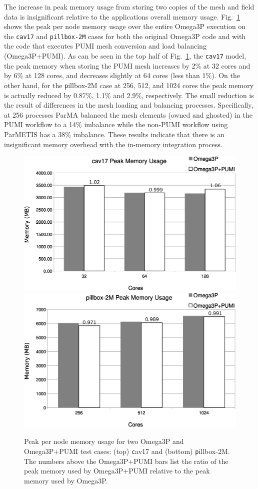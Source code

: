 The increase in peak memory usage from storing two copies of the mesh and
field data is insignificant relative to the applications
overall memory usage.
Fig.~\ref{fig:memusage} shows the peak per node memory usage over the entire
Omega3P execution on the \texttt{cav17} and \texttt{pillbox-2M} cases
for both the original Omega3P code and with the code that executes
PUMI mesh conversion and load balancing (Omega3P+PUMI).
As can be seen in the top half of Fig.~\ref{fig:memusage}, the \texttt{cav17}
model, the peak memory when storing the PUMI mesh increases by 2\% at 32 cores
and by 6\% at 128 cores, and decreases slightly at 64 cores (less than 1\%).
On the other hand, for the {\texttt pillbox-2M} case at 256, 512, and 1024
cores the peak memory is actually reduced by 0.87\%, 1.1\% and 2.9\%,
respectively.
The small reduction is the result of differences in the mesh loading and
balancing processes.
Specifically, at 256 processes ParMA balanced the mesh elements (owned and
ghosted) in the PUMI workflow to a 14\% imbalance while the non-PUMI workflow
using ParMETIS has a 38\% imbalance.
These results indicate that there is an insignificant memory overhead with the
in-memory integration process.

\begin{figure} [h] \centering
  \includegraphics[width=.7\textwidth]{figures/omega3p/cav17-peak-mem.eps}
  \includegraphics[width=.7\textwidth]{figures/omega3p/pillbox2M-peak-mem.eps}
  \caption[Peak per node memory usage for two Omega3P and Omega3P+PUMI test
           cases.]{
    Peak per node memory usage for two Omega3P and Omega3P+PUMI test cases:
    (top) {\texttt cav17} and (bottom) {\texttt pillbox-2M}.
    The numbers above the Omega3P+PUMI bars list the ratio of the peak memory
    used by Omega3P+PUMI relative to the peak memory used by Omega3P.
  }
  \label{fig:memusage}
\end{figure}
